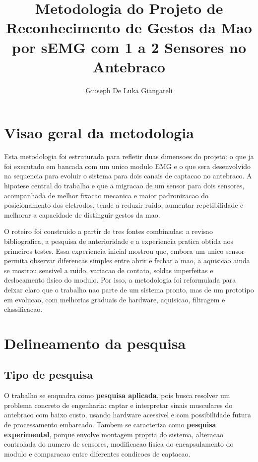 \documentclass[12pt,oneside,a4paper,brazilian]{abntex2}
\title{Metodologia do Projeto de Reconhecimento de Gestos da Mao por sEMG com 1 a 2 Sensores no Antebraco}
\author{Giuseph De Luka Giangareli}
\date{}
\begin{document}
\maketitle

\section{Visao geral da metodologia}

Esta metodologia foi estruturada para refletir duas dimensoes do projeto: o que ja foi executado em bancada com um unico modulo EMG e o que sera desenvolvido na sequencia para evoluir o sistema para dois canais de captacao no antebraco. A hipotese central do trabalho e que a migracao de um sensor para dois sensores, acompanhada de melhor fixacao mecanica e maior padronizacao do posicionamento dos eletrodos, tende a reduzir ruido, aumentar repetibilidade e melhorar a capacidade de distinguir gestos da mao.

O roteiro foi construido a partir de tres fontes combinadas: a revisao bibliografica, a pesquisa de anterioridade e a experiencia pratica obtida nos primeiros testes. Essa experiencia inicial mostrou que, embora um unico sensor permita observar diferencas simples entre abrir e fechar a mao, a aquisicao ainda se mostrou sensivel a ruido, variacao de contato, soldas imperfeitas e deslocamento fisico do modulo. Por isso, a metodologia foi reformulada para deixar claro que o trabalho nao parte de um sistema pronto, mas de um prototipo em evolucao, com melhorias graduais de hardware, aquisicao, filtragem e classificacao.

\section{Delineamento da pesquisa}

\subsection{Tipo de pesquisa}

O trabalho se enquadra como \textbf{pesquisa aplicada}, pois busca resolver um problema concreto de engenharia: captar e interpretar sinais musculares do antebraco com baixo custo, usando hardware acessivel e com possibilidade futura de processamento embarcado. Tambem se caracteriza como \textbf{pesquisa experimental}, porque envolve montagem propria do sistema, alteracao controlada do numero de sensores, modificacao fisica do encapsulamento do modulo e comparacao entre diferentes condicoes de captacao.
\end{document}
